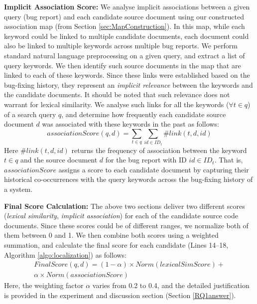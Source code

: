 \documentclass[sigconf,review,anonymous]{acmart}
\begin{document}
\textbf{Implicit Association Score:} We analyse implicit associations between a given query (bug report) and each candidate source document using our constructed association map (from Section \ref{sec:MapConstruction}). In this map, while each keyword could be linked to multiple candidate documents, each document could also be linked to multiple keywords across multiple bug reports. 
We perform standard natural language preprocessing on a given query, and extract a list of query keywords.
We then identify such source documents in the map that are linked to each of these keywords. Since these links were established based on the bug-fixing history, they represent an \emph{implicit relevance} between the keywords and the candidate documents. It should be noted that such relevance does not warrant for lexical similarity.
We analyse such links for all the keywords ($\forall t\in q$) of a search query $q$, and determine how frequently each candidate source document $d$ was associated with these keywords in the past as follows: 
\begin{equation*}\label{CoOccequation}
associationScore(q,d)=\sum_{t\in q}\sum_{id\in ID_t} \#link(t,d,id)
\end{equation*}
Here $\#link(t,d,id)$ returns the frequency of association between the keyword $t\in q$ and the source document $d$ for the bug report with ID $id\in ID_t$.   
That is, $associationScore$ assigns a score to each candidate document by capturing their historical co-occurrences with the query keywords across the bug-fixing history of a system.

\textbf{Final Score Calculation:} The above two sections deliver two different scores (\emph{lexical similarity}, \emph{implicit association}) for each of the candidate source code documents. Since these scores could be of different ranges, we normalize both of them between 0 and 1. We then
combine both scores using a weighted summation, and calculate the final score for each candidate (Lines 14--18, Algorithm \ref{algo:localization}) as follows:
\begin{multline*}\label{equationVSMme}
FinalScore(q,d)=(1-\alpha )\times Norm(lexicalSimScore)+ \\
\alpha \times Norm(associationScore)
\end{multline*}
Here, the weighting factor $\alpha$ varies from 0.2 to 0.4, and
the detailed justification is provided in the experiment and discussion section (Section \ref{RQ1answer}). 
\end{document}
